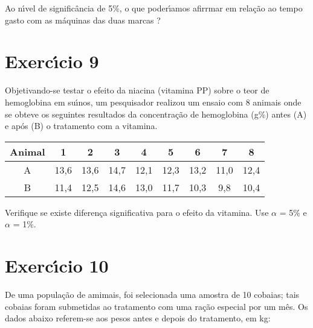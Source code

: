 \documentclass[a4paper,11pt,twoside,openright]{report}
\begin{document}
Ao n\'{\i}vel de signific\^{a}ncia de 5$\%$, o que poder\'{\i}amos afirrmar em rela\c{c}\~{a}o ao tempo gasto com as m\'{a}quinas das duas marcas ?

\section*{Exerc\'{\i}cio 9}
\hspace{0.5cm}Objetivando-se testar o efeito da niacina (vitamina PP) sobre o teor de hemoglobina em su\'{\i}nos, um pesquisador realizou um ensaio 
com 8 animais onde se obteve os seguintes resultados da concentra\c{c}\~{a}o de hemoglobina (g\%) antes (A) e ap\'{o}s (B) o tratamento com a vitamina.

\begin{center}
\begin{tabular}{|l|l|l|l|l|l|l|l|l|}
\hline
\multicolumn{1}{|c|}{Animal} & \multicolumn{1}{c|}{1} & \multicolumn{1}{c|}{2} & \multicolumn{1}{c|}{3} & \multicolumn{1}{c|}{4} & \multicolumn{1}{c|}{5} & \multicolumn{1}{c|}{6} & \multicolumn{1}{c|}{7} & \multicolumn{1}{c|}{8} \\ 
\hline
\multicolumn{1}{|c|}{A} & \multicolumn{1}{c|}{13,6} & \multicolumn{1}{c|}{13,6} & \multicolumn{1}{c|}{14,7} & \multicolumn{1}{c|}{12,1} & \multicolumn{1}{c|}{12,3} & \multicolumn{1}{c|}{13,2} & \multicolumn{1}{c|}{11,0} & \multicolumn{1}{c|}{12,4} \\ 
\hline
\multicolumn{1}{|c|}{B} & \multicolumn{1}{c|}{11,4} & \multicolumn{1}{c|}{12,5} & \multicolumn{1}{c|}{14,6} & \multicolumn{1}{c|}{13,0} & \multicolumn{1}{c|}{11,7} & \multicolumn{1}{c|}{10,3} & \multicolumn{1}{c|}{9,8} & \multicolumn{1}{c|}{10,4} \\ 
\hline
\end{tabular}
\end{center}

Verifique se existe diferen\c{c}a significativa para o efeito da vitamina. Use $\alpha$ = 5$\%$ e $\alpha$ = 1$\%$.

\section*{Exerc\'{\i}cio 10}
\hspace{0.5cm}De uma popula\c{c}\~{a}o de amimais, foi selecionada uma amostra de 10 cobaias; tais cobaias foram submetidas ao tratamento com 
uma ra\c{c}\~{a}o especial por um m\^{e}s. Os dados abaixo referem-se aos pesos antes e depois do tratamento, em kg:
 
\end{document}
